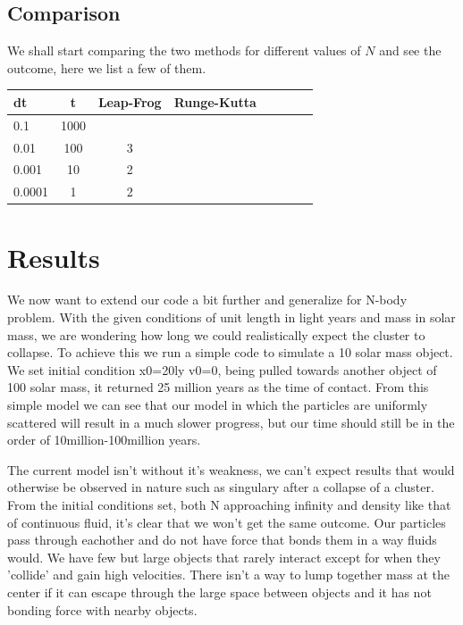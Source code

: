 \documentclass{article}
\begin{document}
\subsection{Comparison}
We shall start comparing the two methods for different values of $N$ and see the outcome, here we list a few of them.\\ 

\begin{tabular}{l|*{6}{c}r}
dt                & t         & Leap-Frog   & Runge-Kutta &\\
\hline
0.1               & 1000      &             &\\
0.01              & 100       & 3           &\\
0.001             & 10        & 2           &\\
0.0001            & 1         & 2           &\\
\end{tabular}

\newpage
\section{Results}
We now want to extend our code a bit further and generalize for N-body problem.
With the given conditions of unit length in light years and mass in solar mass, we are wondering
how long we could realistically expect the cluster to collapse. To achieve this
we run a simple code to simulate a 10 solar mass object. We set initial condition x0=20ly
v0=0, being pulled towards another object of 100 solar mass, it returned 25 million years as
the time of contact. From this simple model we can see that our model in which the
particles are uniformly scattered will result in a much slower progress, but our time
should still be in the order of 10million-100million years.

The current model isn't without it's weakness, we can't expect results that 
would otherwise be observed in nature such as singulary after a collapse of a cluster. 
From the initial conditions set, both N approaching infinity and density like that of continuous fluid,
it's clear that we won't get the same outcome. Our particles pass through eachother and do not have 
force that bonds them in a way fluids would. We have few but large objects that rarely interact except 
for when they 'collide' and gain high velocities. There isn't a way to lump together mass at the center
if it can escape through the large space  between objects and it has not bonding force with nearby objects.
\end{document}
